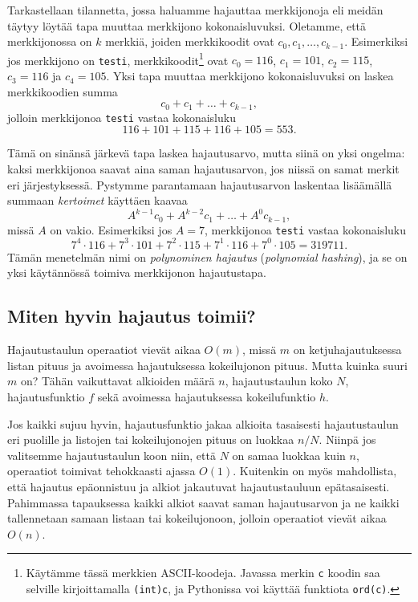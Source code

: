 Tarkastellaan tilannetta, jossa haluamme hajauttaa merkkijonoja
eli mei\-dän täytyy löytää tapa muuttaa merkkijono kokonaisluvuksi.
Oletamme, että merkkijonossa on $k$ merkkiä,
joiden merkkikoodit ovat $c_0,c_1,\dots,c_{k-1}$.
Esimerkiksi jos merkkijono on \texttt{testi},
merkkikoodit\footnote{Käytämme tässä merkkien ASCII-koodeja.
Javassa merkin \texttt{c} koodin saa
selville kirjoittamalla \texttt{(int)c},
ja Pythonissa voi käyttää funktiota \texttt{ord(c)}.} ovat $c_0=116$, $c_1=101$, $c_2=115$,
$c_3=116$ ja $c_4=105$.
Yksi tapa muuttaa merkkijono kokonaisluvuksi
on laskea merkkikoodien summa
\[ c_0 + c_1 + \dots + c_{k-1},\]
jolloin merkkijonoa \texttt{testi} vastaa kokonaisluku
\[116+101+115+116+105=553.\]


Tämä on sinänsä järkevä tapa laskea hajautusarvo, mutta siinä on yksi ongelma:
kaksi merkkijonoa saavat aina saman hajautusarvon,
jos niissä on samat merkit eri järjestyksessä.
Pystymme parantamaan hajautusarvon laskentaa lisäämällä
summaan \emph{kertoimet} käyttäen kaavaa
\[ A^{k-1} c_0 + A^{k-2} c_1 + \dots + A^0 c_{k-1},\]
missä $A$ on vakio.
Esimerkiksi jos $A=7$, merkkijonoa \texttt{testi} vastaa kokonaisluku
\[7^4 \cdot 116+7^3 \cdot 101+7^2 \cdot 115+7^1 \cdot 116+7^0 \cdot 105=319711.\]
Tämän menetelmän nimi on \emph{polynominen hajautus}
(\emph{polynomial hashing}),
ja se on yksi käytännössä toimiva merkkijonon hajautustapa.

\subsection{Miten hyvin hajautus toimii?}

Hajautustaulun operaatiot vievät aikaa $O(m)$,
missä $m$ on ketjuhajautuksessa listan pituus
ja avoimessa hajautuksessa kokeilujonon pituus.
Mutta kuinka suuri $m$ on? Tähän vaikuttavat
alkioiden määrä $n$, hajautustaulun koko $N$,
hajautusfunktio $f$ sekä avoimessa hajautuksessa
kokeilufunktio $h$.

Jos kaikki sujuu hyvin, hajautusfunktio jakaa alkioita
tasaisesti hajautustaulun eri puolille
ja listojen tai kokeilujonojen pituus on luokkaa $n/N$.
Niinpä jos valitsemme hajautustaulun koon niin,
että $N$ on samaa luokkaa kuin $n$,
operaatiot toimivat tehokkaasti ajassa $O(1)$.
Kuitenkin on myös mahdollista, että hajautus epäonnistuu
ja alkiot jakautuvat hajautustauluun epätasaisesti.
Pahimmassa tapauksessa kaikki alkiot saavat saman
hajautusarvon ja ne kaikki tallennetaan samaan listaan
tai kokeilujonoon, jolloin operaatiot vievät aikaa $O(n)$.


